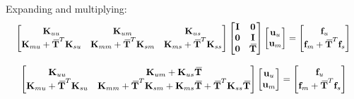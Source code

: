 \documentclass[10pt,b5paper,titlepage]{book}
\newcommand{\m}{\mathbf}
\newcommand{\closure}[2][3]{%
{}\mkern#1mu\overline{\mkern-#1mu#2}}
\begin{document}
Expanding and multiplying:
\begin{equation}
    \scalebox{0.92}{
    $ \begin{bmatrix}
        \m{K}_{uu} & \m{K}_{um} & \m{K}_{us} \\
        \m{K}_{mu} + \m{\closure{T}}^T \m{K}_{su} &
        \m{K}_{mm} + \m{\closure{T}}^T \m{K}_{sm} &
        \m{K}_{ms} + \m{\closure{T}}^T \m{K}_{ss} \\
    \end{bmatrix}
    \begin{bmatrix}
        \m{I} & \m{0} \\
        \m{0} & \m{I} \\
        \m{0} & \m{\closure{T}} \\
    \end{bmatrix}
    \begin{bmatrix}
        \m{u}_u \\
        \m{u}_m \\
    \end{bmatrix}
    = \begin{bmatrix}
        \m{f}_u \\
        \m{f}_m + \m{\closure{T}}^T \m{f}_s \\
    \end{bmatrix} $
    }
\end{equation}

\begin{equation}
    \scalebox{0.95}{
    $ \begin{bmatrix}
        \m{K}_{uu} & \m{K}_{um} + \m{K}_{us} \m{\closure{T}} \\
        \m{K}_{mu} + \m{\closure{T}}^T \m{K}_{su} &
        \m{K}_{mm} + \m{\closure{T}}^T \m{K}_{sm} +
        \m{K}_{ms} \m{\closure{T}} + \m{\closure{T}}^T \m{K}_{ss} \m{\closure{T}} \\
    \end{bmatrix}
    \begin{bmatrix}
        \m{u}_u \\
        \m{u}_m \\
    \end{bmatrix}
    = \begin{bmatrix}
        \m{f}_u \\
        \m{f}_m + \m{\closure{T}}^T \m{f}_s \\
    \end{bmatrix} $
    }
\end{equation}
\end{document}
